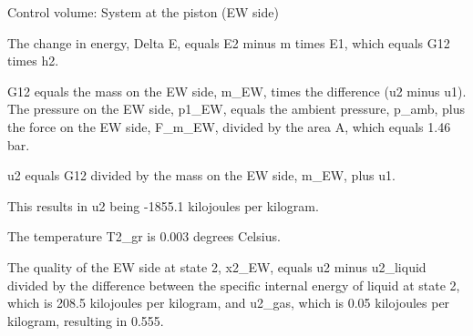 Control volume: System at the piston (EW side)

The change in energy, Delta E, equals E2 minus m times E1, which equals G12 times h2.

G12 equals the mass on the EW side, m_EW, times the difference (u2 minus u1). The pressure on the EW side, p1_EW, equals the ambient pressure, p_amb, plus the force on the EW side, F_m_EW, divided by the area A, which equals 1.46 bar.

u2 equals G12 divided by the mass on the EW side, m_EW, plus u1.

This results in u2 being -1855.1 kilojoules per kilogram.

The temperature T2_gr is 0.003 degrees Celsius.

The quality of the EW side at state 2, x2_EW, equals u2 minus u2_liquid divided by the difference between the specific internal energy of liquid at state 2, which is 208.5 kilojoules per kilogram, and u2_gas, which is 0.05 kilojoules per kilogram, resulting in 0.555.